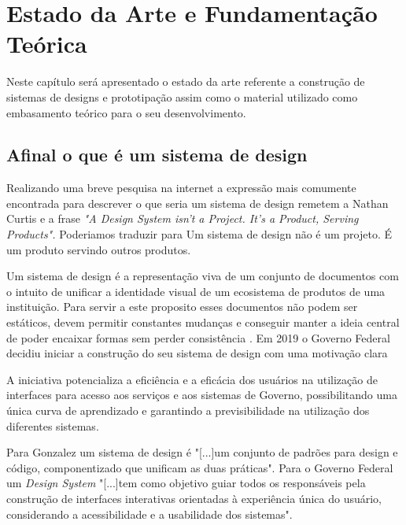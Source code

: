 \chapter[Capítulo 2]{Estado da Arte e Fundamentação Teórica}
\label{ch:cap2}

  Neste capítulo será apresentado o estado da arte referente a construção de sistemas de designs e prototipação assim como o material utilizado como embasamento teórico para o seu desenvolvimento.

\section{Afinal o que é um sistema de design}
  Realizando uma breve pesquisa na internet a expressão mais comumente encontrada para descrever o que seria um sistema de design remetem a Nathan Curtis e a frase \textit{"A Design System isn’t a Project. It’s a Product, Serving Products".} \cite{descricao_sistema_design} Poderiamos traduzir para Um sistema de design não é um projeto. É um produto servindo outros produtos.

  Um sistema de design é a representação viva de um conjunto de documentos com o intuito de unificar a identidade visual de um ecosistema de produtos de uma instituição. Para servir a este proposito esses documentos não podem ser estáticos, devem permitir constantes mudanças e conseguir manter a ideia central de poder encaixar formas sem perder consistência \cite{design_gov_digital}.
  Em 2019 o Governo Federal decidiu iniciar a construção do seu sistema  de design com uma motivação clara

\begin{citacao}[brazil]
  [...]A iniciativa potencializa a eficiência e a eficácia dos usuários na utilização de interfaces para acesso aos serviços e aos sistemas de Governo, possibilitando uma única curva de aprendizado e garantindo a previsibilidade na utilização dos diferentes sistemas. \cite{design_gov_federal}
\end{citacao}

  Para Gonzalez um sistema de design é "[...]um conjunto de padrões para design e código, componentizado que unificam as duas práticas". \cite{GuilhermeGonzalez} Para o Governo Federal um \textit{Design System} "[...]tem como objetivo guiar todos os responsáveis pela construção de interfaces interativas orientadas à experiência única do usuário, considerando a acessibilidade e a usabilidade dos sistemas". \cite{design_gov_federal}

